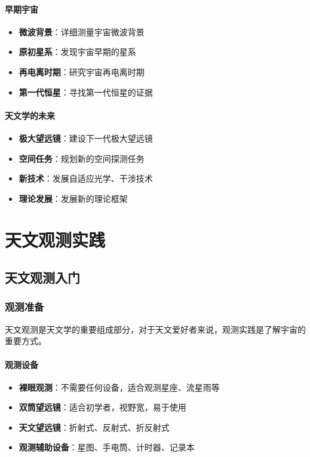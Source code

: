 \documentclass[12pt,UTF8]{ctexbook}
\begin{document}
\subsection{早期宇宙}

\begin{itemize}
  \item \textbf{微波背景}：详细测量宇宙微波背景
  \item \textbf{原初星系}：发现宇宙早期的星系
  \item \textbf{再电离时期}：研究宇宙再电离时期
  \item \textbf{第一代恒星}：寻找第一代恒星的证据
\end{itemize}

\subsection{天文学的未来}

\begin{itemize}
  \item \textbf{极大望远镜}：建设下一代极大望远镜
  \item \textbf{空间任务}：规划新的空间探测任务
  \item \textbf{新技术}：发展自适应光学、干涉技术
  \item \textbf{理论发展}：发展新的理论框架
\end{itemize}

\part{天文观测实践}

\chapter{天文观测入门}
\section{观测准备}

天文观测是天文学的重要组成部分，对于天文爱好者来说，观测实践是了解宇宙的重要方式。

\subsection{观测设备}

\begin{itemize}
  \item \textbf{裸眼观测}：不需要任何设备，适合观测星座、流星雨等
  \item \textbf{双筒望远镜}：适合初学者，视野宽，易于使用
  \item \textbf{天文望远镜}：折射式、反射式、折反射式
  \item \textbf{观测辅助设备}：星图、手电筒、计时器、记录本
\end{itemize}
\end{document}
